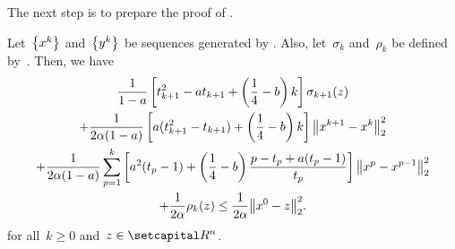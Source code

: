 \documentclass[../main]{subfiles}
\begin{document}
The next step is to prepare the proof of .
\begin{lemma} 
    Let~$\set*{x^k}$ and~$\set*{y^k}$ be sequences generated by .
    Also, let~$\sigma_k$ and~$\rho_k$ be defined by~.
    Then, we have
    \begin{multline}
        \frac{1}{1 - a} \left[ t_{k + 1}^2 - a t_{k + 1} + \left( \frac{1}{4} - b \right) k \right] \sigma_{k + 1}(z) \\
        + \frac{1}{2 \alpha (1 - a)} \left[ a (t_{k + 1}^2 - t_{k + 1}) + \left( \frac{1}{4} - b \right) k \right] \norm*{x^{k + 1} - x^k}_2^2 \\
        + \frac{1}{2 \alpha (1 - a)} \sum_{p = 1}^{k} \left[ a^2 (t_p - 1) + \left( \frac{1}{4} - b \right) \frac{p - t_p + a(t_p - 1)}{t_p} \right] \norm*{x^p - x^{p - 1}}_2^2 \\
        + \frac{1}{2 \alpha} \rho_k(z)
        \le \frac{1}{2 \alpha} \norm*{x^0 - z}_2^2
        .\end{multline}
    for all~$k \ge 0$ and~$z \in \setR^n$.
\end{lemma}
\end{document}
